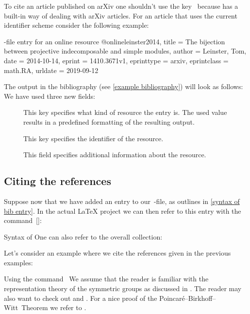 To cite an article published on arXiv one shouldn’t use the key~ because  has a built-in way of dealing with arXiv articles.
For an article that uses the current identifier scheme consider the following example:
\begin{showcode}{-file entry for an online resource}
@online{leinster2014,
  title       = {The bijection between projective indecomposable and simple modules},
  author      = {Leinster, Tom},
  date        = {2014-10-14},
  eprint      = {1410.3671v1},
  eprinttype  = {arxiv},
  eprintclass = {math.RA},
  urldate     = {2019-09-12}
}
\end{showcode}
The output in the bibliography (see \cref{example bibliography}) will look as follows:
We have used three new fields:
\begin{description}
  \item[]
    This key specifies what kind of resource the entry is.
    The used value~ results in a predefined formatting of the resulting output.
  \item[]
    This key specifies the identifier of the resource.
  \item[]
    This field specifies additional information about the resource.
\end{description}





\subsection{Citing the references}

Suppose now that we have added an entry to our~-file, as outlines in \cref{syntax of bib entry}.
In the actual {\LaTeX} project we can then refer to this entry with the command~[\comname]:
\begin{showcode}{Syntax of }
\cite[details]{label}
One can also refer to the overall collection:
\end{showcode}
Let’s consider an example where we cite the references given in the previous examples:
\begin{showlatex}[label = {using cite}]{Using the command~}
We assume that the reader is familiar with the representation theory of the symmetric groups as discussed in \cite[\S 4]{fultonharris2004}.
The reader may also want to check out \cite{benson1991} and \cite{cayley_graph}.
For a nice proof of the Poincaré--Birkhoff--Witt~Theorem we refer to \cite[\S 3]{diamond_lemma}.
\end{showlatex}

